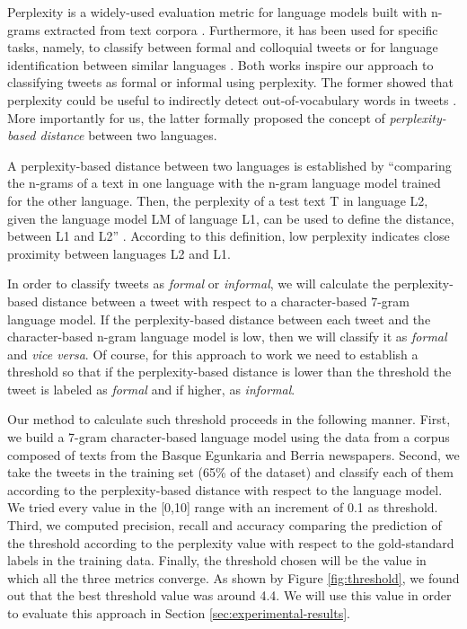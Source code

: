 \documentclass[information,article,submit,moreauthors,pdftex,10pt,a4paper]{Definitions/mdpi}
\begin{document}
Perplexity is a widely-used evaluation metric for language models built with n-grams extracted from text corpora \cite{chen1999empirical}. Furthermore, it has been used for specific tasks, namely, to classify between formal and colloquial tweets \cite{gonzalez2015analysis} or for language identification between similar languages \cite{gamallo2017language}. Both works inspire our approach to classifying tweets as formal or informal using perplexity. The former showed that perplexity could be useful to indirectly detect out-of-vocabulary words in tweets \cite{gonzalez2015analysis}. More importantly for us, the latter formally proposed the concept of \emph{perplexity-based distance} between two languages.

A perplexity-based distance between two languages is established by ``comparing the n-grams of a text in one language with the n-gram language model trained for the other language. Then, the perplexity of a test text T in language L2, given the language model LM of language L1, can be used to define the distance, between L1 and L2'' \cite{gamallo2017language}. According to this definition, low perplexity indicates close proximity between languages L2 and L1.

In order to classify tweets as \emph{formal} or \emph{informal}, we will calculate the perplexity-based distance between a tweet with respect to a character-based 7-gram language model. If the perplexity-based distance between each tweet and the character-based n-gram language model is low, then we will classify it as \emph{formal} and \emph{vice versa}. Of course, for this approach to work we need to establish a threshold so that if the perplexity-based distance is lower than the threshold the tweet is labeled as \emph{formal} and if higher, as \emph{informal}.

Our method to calculate such threshold proceeds in the following manner. First, we build a 7-gram character-based language model using the data from a corpus composed of texts from the Basque  Egunkaria and Berria newspapers. Second, we take the tweets in the training set (65\% of the dataset) and classify each of them according to the perplexity-based distance with respect to the language model. We tried every value in the [0,10] range
with an increment of 0.1 as threshold. Third, we computed precision, recall and accuracy comparing the prediction of the threshold according to the perplexity value with respect to the gold-standard labels in the training data. Finally, the threshold chosen will be the value in which all the three metrics converge. As shown by Figure \ref{fig:threshold}, we found out that the best threshold value was around 4.4. We will use this value in order to evaluate this approach in Section \ref{sec:experimental-results}.
\end{document}
